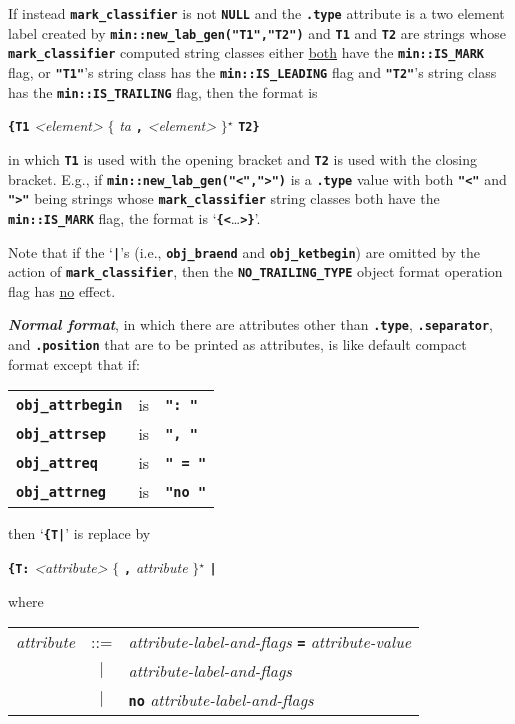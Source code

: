 \documentclass[12pt]{article}
\newcommand{\TT}[1]{{\tt \bfseries #1}}
\newcommand{\STAR}{{\Large $^\star$}}
\newcommand{\OPEN}{{$\{$}}
\newcommand{\CLOSE}{{$\}$}}
\newcommand{\ikey}[2]{{\bf \em #1}\index{#2}}
\newcommand{\EOL}{\penalty \exhyphenpenalty}
\begin{document}
If instead \TT{mark\_\EOL classifier} is not
\TT{NULL} and the \TT{.type} attribute is a two element label created by
\TT{min::new\_\EOL lab\_\EOL gen("T1","T2")} and
\TT{T1} and \TT{T2} are strings whose \TT{mark\_\EOL classifier} computed
string classes either
\underline{both} have the \TT{min::\EOL IS\_\EOL MARK} flag, or
\TT{"T1"}'s string class has the \TT{min::\EOL IS\_\EOL LEADING} flag and
\TT{"T2"}'s string class has the \TT{min::\EOL IS\_\EOL TRAILING} flag,
then the format is
\begin{center}
\TT{\{}\TT{T1} {\em <element>}
    \OPEN{} {\em ta} \TT{,} \TT{\textvisiblespace} {\em <element>} \CLOSE\STAR{}
    \TT{T2}\TT{\}}
\end{center}
in which \TT{T1} is used with the opening bracket and \TT{T2} is used
with the closing bracket.
E.g., if \TT{min::\EOL new\_\EOL lab\_\EOL gen("<",">")} is a \TT{.type}
value with both \TT{"<"} and \TT{">"} being strings whose
\TT{mark\_\EOL classifier} string classes both have the
\TT{min::\EOL IS\_\EOL MARK} flag, the format is `\TT{\{<}\ldots\TT{>\}}'.

Note that if the `\TT{|}'s (i.e., \TT{obj\_\EOL braend} and
\TT{obj\_\EOL ketbegin}) are omitted by the action of
\TT{mark\_\EOL classifier}, then the \TT{NO\_\EOL TRAILING\_\EOL TYPE}
object format operation flag has \underline{no} effect.

\ikey{Normal format}{normal format!of printed object}, in which there
are attributes other than \TT{.type}, \TT{.separator}, and \TT{.posi\-tion}
that are to be printed as attributes,
is like default compact format except that if:
\begin{center}
\begin{tabular}{lcl}
\TT{obj\_attrbegin}	& is	& \TT{": "} \\
\TT{obj\_attrsep}	& is	& \TT{", "} \\
\TT{obj\_attreq}	& is	& \TT{" = "} \\
\TT{obj\_attrneg}	& is	& \TT{"no "} \\
\end{tabular}
\end{center}
then `\TT{\{T|}' is replace by
\begin{center}
\TT{\{}\TT{T}\TT{:\textvisiblespace} {\em <attribute>}
    \OPEN{} \TT{,\textvisiblespace} {\em attribute} \CLOSE\STAR{} \TT{|}
\end{center}
where
\begin{center}
\begin{tabular}{rcl}
{\em attribute} & ::= & {\em attribute-label-and-flags}
                        \TT{\textvisiblespace=\textvisiblespace}
			{\em attribute-value} \\
		& $|$ & {\em attribute-label-and-flags} \\
		& $|$ & \TT{no\textvisiblespace}
		        {\em attribute-label-and-flags} \\
\end{tabular}
\end{center}
\end{document}
